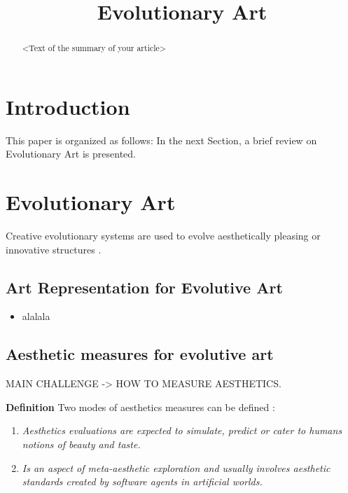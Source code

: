 \documentclass{llncs}
\title{Evolutionary Art}
\author{}
\begin{document}
\maketitle

\begin{abstract}
<Text of the summary of your article>
\end{abstract}

\section{Introduction}\label{intro}

This paper is organized as follows: In the next Section, a brief review on Evolutionary Art is presented. 

\section{Evolutionary Art}\label{evo_art}

Creative evolutionary systems are used to evolve aesthetically pleasing or innovative structures \cite{dipaola2009incorporating}.

\subsection{Art Representation for Evolutive Art} \label{evo_art:repr}
\begin{itemize}
	\item alalala
\end{itemize}

\subsection{Aesthetic measures for evolutive art}\label{evo_art:aesth}
MAIN CHALLENGE -> HOW TO MEASURE AESTHETICS.

{\bf Definition} Two modes of aesthetics measures can be defined \cite{galanter2012computational}: 

\begin{enumerate}
\item {\em Aesthetics evaluations are expected to simulate, predict or cater to humans notions of beauty and taste.} 
\item {\em Is an aspect of meta-aesthetic exploration and usually involves aesthetic standards created by software agents in artificial worlds.}
\end{enumerate}
\end{document}

